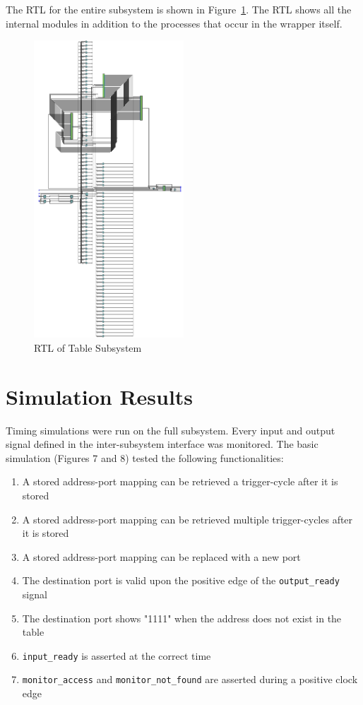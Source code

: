 \documentclass{article}
\begin{document}
The RTL for the entire subsystem is shown in Figure~\ref{fig:table-rtl}. The RTL shows all the internal modules in addition to the processes that occur in the wrapper itself.

\begin{figure}[ht!]
  \centering
  	\includegraphics[width=0.5\textwidth]{table_rtl.PNG}
  \caption{RTL of Table Subsystem}
  \label{fig:table-rtl}
\end{figure}

\newpage
\section{Simulation Results}

Timing simulations were run on the full subsystem. Every input and output signal defined in the inter-subsystem interface was monitored. The basic simulation (Figures 7 and 8) tested the following functionalities:

\begin{enumerate}
\item A stored address-port mapping can be retrieved a trigger-cycle after it is stored
\item A stored address-port mapping can be retrieved multiple trigger-cycles after it is stored
\item A stored address-port mapping can be replaced with a new port
\item The destination port is valid upon the positive edge of the \texttt{output\_ready} signal
\item The destination port shows "1111" when the address does not exist in the table
\item \texttt{input\_ready} is asserted at the correct time
\item \texttt{monitor\_access} and \texttt{monitor\_not\_found} are asserted during a positive clock edge
\end{enumerate}
\end{document}
